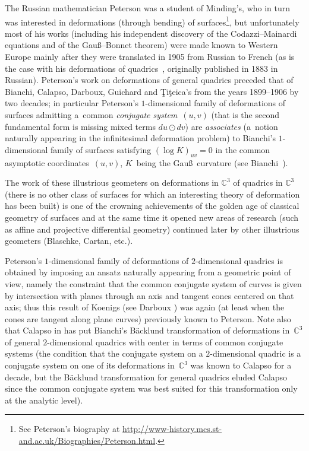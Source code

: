 \documentclass[pdftex]{sigma}
\begin{document}
The Russian mathematician Peterson was a student of Minding's, who
in turn was interested in deformations (through bending) of
surfaces\footnote{See Peterson's biography at \url{http://www-history.mcs.st-and.ac.uk/Biographies/Peterson.html}.}, but unfortunately most of his works
(including his independent discovery of the Codazzi--Mainardi
equations and of the Gau\ss--Bonnet theorem) were made known to
Western Europe mainly after they were translated in 1905 from
Russian to French (as is the case with his deformations of
quadrics~\cite{P}, originally published in 1883 in Russian).
Peterson's work on deformations of general quadrics preceded that
of Bianchi, Calapso, Darboux, Guichard and \c{T}i\c{t}eica's from
the years 1899--1906 by two decades; in particu\-lar Peterson's
$1$-dimensional family of deformations of surfaces admitting a~common {\it conjugate system}~$(u,v)$ (that is the second
fundamental form is missing mixed terms $du\odot dv$) are {\it
associates} (a~notion naturally appearing in the inf\/initesimal
deformation problem) to Bianchi's $1$-dimensional family of
surfaces satisfying $(\log K)_{uv}=0$ in the common asymptotic
coordinates~$(u,v)$, $K$~being the Gau\ss\ curvature (see Bianchi~\cite[Vol.~2, \S\S~294, 295]{B1}).

The work of these illustrious geometers on deformations in
$\mathbb{C}^3$ of quadrics in $\mathbb{C}^3$ (there is no other
class of surfaces for which an interesting theory of deformation
has been built) is one of the crowning achievements of the golden
age of classical geometry of surfaces and at the same time it
opened new areas of research (such as af\/f\/ine and projective
dif\/ferential geometry) continued later by other illustrious
geometers (Blaschke, Cartan, etc.).

Peterson's $1$-dimensional family of deformations of
$2$-dimensional quadrics is obtained by imposing an ansatz
naturally appearing from a geometric point of view, namely the
constraint that the common conjugate system of curves is given by
intersection with planes through an axis and tangent cones
centered on that axis; thus this result of Koenigs (see Darboux
\cite[\S\S~91--101]{D}) was again (at least when the cones are
tangent along plane curves) previously known to Peterson. Note
also that Calapso in \cite{Ca} has put Bianchi's B\"{a}cklund
transformation of deformations in~$\mathbb{C}^3$ of general
$2$-dimensional quadrics with center in terms of common conjugate
systems (the condition that the conjugate system on a
$2$-dimensional quadric is a conjugate system on one of its
deformations in~$\mathbb{C}^3$ was known to Calapso for a decade,
but the B\"{a}cklund transformation for general quadrics eluded
Calapso since the common conjugate system was best suited for this
transformation only at the analytic level).
\end{document}
